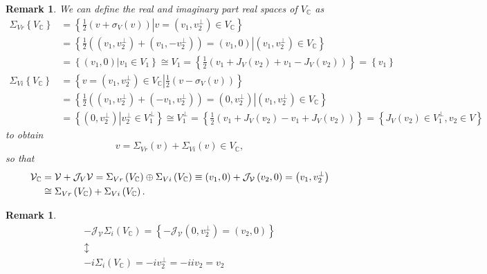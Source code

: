 \documentclass[aps,preprint]{revtex4}
\newtheorem{remark}[theorem]{Remark}
\begin{document}
\begin{remark}
We can define the real and imaginary part real spaces of $V_{\mathbb{C}}$ as 
\begin{align}
\Sigma _{Vr}\left\{ V_{\mathbb{C}}\right\} & =\left\{ \frac{1}{2}\left(
v+\sigma _{V}\left( v\right) \right) \left\vert v=\left( v_{1},v_{2}^{\bot
}\right) \in V_{\mathbb{C}}\right. \right\} \\
& =\left\{ \frac{1}{2}\left( \left( v_{1},v_{2}^{\bot }\right) +\left(
v_{1},-v_{2}^{\bot }\right) \right) =\left( v_{1},0\right) \left\vert \left(
v_{1},v_{2}^{\bot }\right) \in V_{\mathbb{C}}\right. \right\} \\
& =\left\{ \left. \left( v_{1},0\right) \right\vert v_{1}\in V_{1}\right\}
\cong V_{1}=\left\{ \frac{1}{2}\left( v_{1}+J_{V}\left( v_{2}\right)
+v_{1}-J_{V}\left( v_{2}\right) \right) \right\} =\left\{ v_{1}\right\} \\
\Sigma _{Vi}\left\{ V_{\mathbb{C}}\right\} & =\left\{ v=\left(
v_{1},v_{2}^{\bot }\right) \in V_{\mathbb{C}}\left\vert \frac{1}{2}\left(
v-\sigma _{V}\left( v\right) \right) \right. \right\} \\
& =\left\{ \frac{1}{2}\left( \left( v_{1},v_{2}^{\bot }\right) +\left(
-v_{1},v_{2}^{\bot }\right) \right) =\left( 0,v_{2}^{\bot }\right)
\left\vert \left( v_{1},v_{2}^{\bot }\right) \in V_{\mathbb{C}}\right.
\right\} \\
& =\left\{ \left. \left( 0,v_{2}^{\bot }\right) \right\vert v_{2}^{\bot }\in
V_{1}^{\bot }\right\} \cong V_{1}^{\bot }=\left\{ \frac{1}{2}\left(
v_{1}+J_{V}\left( v_{2}\right) -v_{1}+J_{V}\left( v_{2}\right) \right)
\right\} =\left\{ J_{V}\left( v_{2}\right) \in V_{1}^{\bot },v_{2}\in
V\right\}
\end{align}%
to obtain 
\begin{equation}
v=\Sigma _{Vr}\left( v\right) +\Sigma _{Vi}\left( v\right) \in V_{\mathbb{C}%
},
\end{equation}%
so that%
\begin{align}
\mathcal{V}_{\mathbb{C}}& =\mathcal{V}+\mathcal{J}_{V}\mathcal{V}=\Sigma
_{Vr}\left( V_{\mathbb{C}}\right) \oplus \Sigma _{Vi}\left( V_{\mathbb{C}%
}\right) \equiv \left( v_{1},0\right) +\mathcal{J}_{\mathcal{V}}\left(
v_{2},0\right) =\left( v_{1},v_{2}^{\bot }\right) \\
& \cong \Sigma _{Vr}\left( V_{\mathbb{C}}\right) +\Sigma _{Vi}\left( V_{%
\mathbb{C}}\right) .
\end{align}
\end{remark}

\begin{remark}
\begin{gather}
-\mathcal{J}_{\mathcal{V}}\Sigma _{i}\left( V_{\mathbb{C}}\right) =\left\{ -%
\mathcal{J}_{\mathcal{V}}\left( 0,v_{2}^{\bot }\right) =\left(
v_{2},0\right) \right\} \\
\updownarrow \\
-i\Sigma _{i}\left( V_{\mathbb{C}}\right) =-iv_{2}^{\bot }=-iiv_{2}=v_{2}
\end{gather}
\end{remark}
\end{document}
